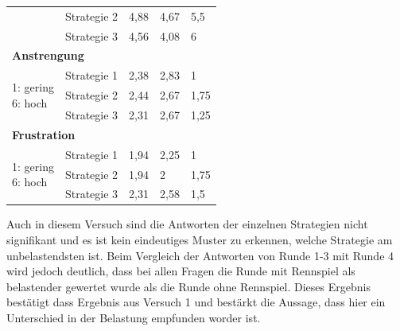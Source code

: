 \documentclass[12pt,a4paper]{scrartcl}
\begin{document}
\begin{longtable}{|p{4cm}|p{2cm}|p{2cm}|p{2cm}|p{2cm}|}
 & Strategie 2 & 4,88 & 4,67 & 5,5 \\
 & Strategie 3 & 4,56 & 4,08 & 6 \\
\hline
		\multicolumn{5}{l}{\textbf{Anstrengung}}\\
		\hline
\multirow{3}{4cm}{1: gering \newline 6: hoch} & Strategie 1 & 2,38 & 2,83 & 1 \\
 & Strategie 2 & 2,44 & 2,67 & 1,75 \\
 & Strategie 3 & 2,31 & 2,67 & 1,25\\
\hline
		\multicolumn{5}{l}{\textbf{Frustration}}\\
		\hline
\multirow{3}{4cm}{1: gering \newline 6: hoch} & Strategie 1 & 1,94 & 2,25 & 1 \\
 & Strategie 2 & 1,94 & 2 & 1,75 \\
 & Strategie 3 & 2,31 & 2,58 & 1,5 \\
\hline
\end{longtable}

Auch in diesem Versuch sind die Antworten der einzelnen Strategien nicht signifikant und es ist kein eindeutiges Muster zu erkennen, welche Strategie am unbelastendsten ist. Beim Vergleich der Antworten von Runde 1-3 mit Runde 4 wird jedoch deutlich, dass bei allen Fragen die Runde mit Rennspiel als belastender gewertet wurde als die Runde ohne Rennspiel. Dieses Ergebnis bestätigt dass Ergebnis aus Versuch 1 und bestärkt die Aussage, dass hier ein Unterschied in der Belastung empfunden worder ist.  
\end{document}
